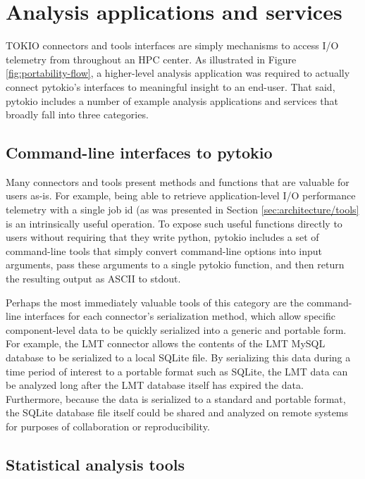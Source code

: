 \section{Analysis applications and services} \label{sec:apps}

TOKIO connectors and tools interfaces are simply mechanisms to access I/O telemetry from throughout an HPC center.
As illustrated in Figure \ref{fig:portability-flow}, a higher-level analysis application was required to actually connect pytokio's interfaces to meaningful insight to an end-user.
That said, pytokio includes a number of example analysis applications and services that broadly fall into three categories.

\subsection{Command-line interfaces to pytokio} \label{sec:apps/cli}

Many connectors and tools present methods and functions that are valuable for users as-is.
For example, being able to retrieve application-level I/O performance telemetry with a single job id (as was presented in Section \ref{sec:architecture/tools} is an intrinsically useful operation.
To expose such useful functions directly to users without requiring that they write python, pytokio includes a set of command-line tools that simply convert command-line options into input arguments, pass these arguments to a single pytokio function, and then return the resulting output as ASCII to stdout.

Perhaps the most immediately valuable tools of this category are the command-line interfaces for each connector's serialization method, which allow specific component-level data to be quickly serialized into a generic and portable form.
For example, the LMT connector allows the contents of the LMT MySQL database to be serialized to a local SQLite file.
By serializing this data during a time period of interest to a portable format such as SQLite, the LMT data can be analyzed long after the LMT database itself has expired the data.
Furthermore, because the data is serialized to a standard and portable format, the SQLite database file itself could be shared and analyzed on remote systems for purposes of collaboration or reproducibility.

\subsection{Statistical analysis tools} \label{sec:apps/analysis}

